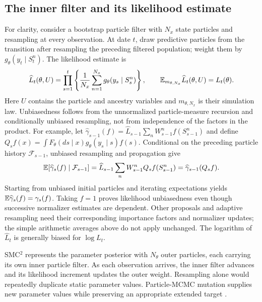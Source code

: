 \subsection{The inner filter and its likelihood estimate}

For clarity, consider a bootstrap particle filter with $N_x$ state particles
and resampling at every observation. At date $t$, draw predictive particles
from the transition after resampling the preceding filtered population;
weight them by $g_\theta(y_t\mid S_t^n)$. The likelihood estimate is
\begin{equation}
 \widehat L_t(\theta,U)
 =\prod_{s=1}^t\left\{\frac{1}{N_x}
                     \sum_{n=1}^{N_x}g_\theta(y_s\mid S_s^n)\right\},
 \qquad \mathbb{E}_{m_{\theta,N_x}}\widehat L_t(\theta,U)=L_t(\theta).
 \label{eq:bf-is-smc2-likelihood-estimate}
\end{equation}
Here $U$ contains the particle and ancestry variables and
$m_{\theta,N_x}$ is their simulation law. Unbiasedness follows from the
unnormalized particle-measure recursion and conditionally unbiased
resampling, not from independence of the factors in the product.
For example, let $\widehat\gamma_{s-1}(f)
=\widehat L_{s-1}\sum_n W_{s-1}^n f(S_{s-1}^n)$ and define
$Q_s f(x)=\int F_\theta(ds\mid x)g_\theta(y_s\mid s)f(s)$.
Conditional on the preceding particle history $\mathcal F_{s-1}$,
unbiased resampling and propagation give
\begin{equation}
 \mathbb{E}[\widehat\gamma_s(f)\mid\mathcal F_{s-1}]
 =\widehat L_{s-1}\sum_n W_{s-1}^n Q_sf(S_{s-1}^n)
 =\widehat\gamma_{s-1}(Q_sf).
 \label{eq:bf-is-smc2-unbiased-recursion}
\end{equation}
Starting from unbiased initial particles and iterating expectations yields
$\mathbb{E}\widehat\gamma_s(f)=\gamma_s(f)$. Taking $f=1$ proves likelihood
unbiasedness even though successive normalizer estimates are dependent.
Other proposals and adaptive resampling need their corresponding importance
factors and normalizer updates; the simple arithmetic averages above do
not apply unchanged. The logarithm of $\widehat L_t$ is generally biased
for $\log L_t$.

SMC$^2$ represents the parameter posterior with $N_\theta$ outer particles,
each carrying its own inner particle filter. As each observation arrives,
the inner filter advances and its likelihood increment updates the outer
weight. Resampling alone would repeatedly duplicate static parameter
values. Particle-MCMC mutation supplies new parameter values while
preserving an appropriate extended target
\citep[Sections 3.1--3.2]{chopin2013smc2}.

